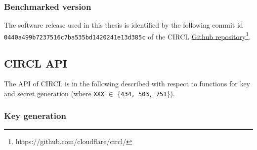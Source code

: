 \subsubsection{Benchmarked version}
The software release used in this thesis is identified by the following commit id \\ \texttt{0440a499b7237516c7ba535bd1420241e13d385c} of the \gls{CIRCL} \href{https://github.com/cloudflare/circl/}{Github repository}\footnote{https://github.com/cloudflare/circl/}.

\subsection{\gls{CIRCL} API}
The API of \gls{CIRCL} is in the following described with respect to functions for key and secret generation (where \texttt{XXX} $\in$ \{\texttt{434, 503, 751}\}).

\subsubsection{Key generation}

